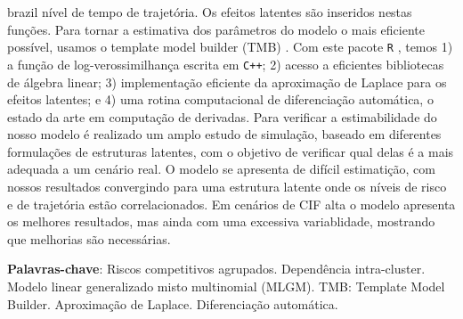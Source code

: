 \documentclass[12pt, %
               openright, %
               oneside, %
               a4paper, %
               chapter=TITLE, %
               section=TITLE, %
               brazil,
               english %
]{abntex2}
\begin{document}
\begin{resumo}[]
\begin{otherlanguage*}{brazil}
    n\'{i}vel de tempo de trajet\'{o}ria. Os efeitos latentes são
    inseridos nestas fun\c{c}\~{o}es. Para tornar a estimativa dos
    par\^{a}metros do modelo o mais eficiente poss\'{i}vel, usamos o
    template model builder (TMB) \cite{TMB}. Com este pacote \texttt{R}
    \cite{R21}, temos 1) a fun\c{c}\~{a}o de log-verossimilhan\c{c}a
    escrita em \texttt{C++}; 2) acesso a eficientes bibliotecas de
    \'{a}lgebra linear; 3) implementa\c{c}\~{a}o eficiente da
    aproxima\c{c}\~{a}o de Laplace para os efeitos latentes; e 4) uma
    rotina computacional de diferencia\c{c}\~{a}o autom\'{a}tica, o
    estado da arte em computa\c{c}\~{a}o de derivadas. Para verificar a
    estimabilidade do nosso modelo \'{e} realizado um amplo estudo de
    simula\c{c}\~{a}o, baseado em diferentes formula\c{c}\~{o}es de
    estruturas latentes, com o objetivo de verificar qual delas \'{e} a
    mais adequada a um cen\'{a}rio real. O modelo se apresenta de
    dif\'{i}cil estimati\c{c}\~{a}o, com nossos resultados convergindo
    para uma estrutura latente onde os n\'{i}veis de risco e de
    trajet\'{o}ria est\~{a}o correlacionados. Em cen\'{a}rios de CIF
    alta o modelo apresenta os melhores resultados, mas ainda com uma
    excessiva variablidade, mostrando que melhorias s\~{a}o
    necess\'{a}rias.
    
    \vfill
    \textbf{Palavras-chave}: Riscos competitivos agrupados.
                             Depend\^{e}ncia intra-cluster.
                             Modelo linear generalizado misto
                             multinomial (MLGM).
                             TMB: Template Model Builder.
                             Aproxima\c{c}\~{a}o de Laplace.
                             Diferencia\c{c}\~{a}o autom\'{a}tica.
  \end{otherlanguage*}
\end{resumo}
\listoffigures*
\cleardoublepage
\makeatletter
\renewcommand\numberline[1]{
	\leftskip -0.7em
	\rightskip 1.6em
	\parfillskip -\rightskip
	\parindent 0em
	\@tempdima 2.0em
	\vspace{0em}
  \advance\leftskip \@tempdima \null\nobreak\hskip -\leftskip
	ALGORITHM \normalfont #1 ~~ }
\makeatother
\end{document}
